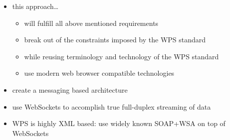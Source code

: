 \begin{itemize}
\begin{itemize}
		\end{itemize}
		\item this approach\dots
		\begin{itemize}
			\item will fulfill all above mentioned requirements
			\item break out of the constraints imposed by the WPS standard
			\item while reusing terminology and technology of the WPS standard
			\item use modern web browser compatible technologies
		\end{itemize}
		\item create a messaging based architecture
		\item use WebSockets to accomplish true full-duplex streaming of data
		\item WPS is highly XML based: use widely known SOAP+WSA on top of WebSockets
	\end{itemize}

